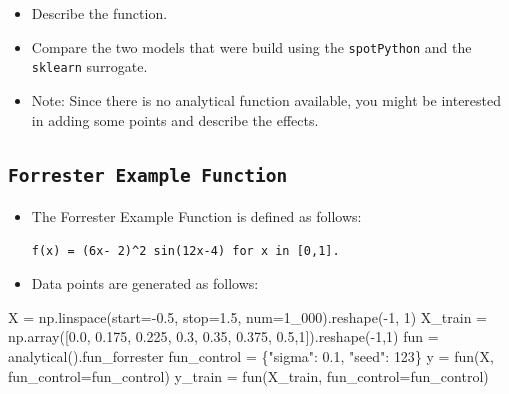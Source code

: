 \documentclass[
  letterpaper,
  DIV=11,
  numbers=noendperiod]{scrreprt}
\newenvironment{Shaded}{\begin{snugshade}}{\end{snugshade}}
\newcommand{\DecValTok}[1]{\textcolor[rgb]{0.68,0.00,0.00}{#1}}
\newcommand{\FloatTok}[1]{\textcolor[rgb]{0.68,0.00,0.00}{#1}}
\newcommand{\NormalTok}[1]{\textcolor[rgb]{0.00,0.23,0.31}{#1}}
\newcommand{\OperatorTok}[1]{\textcolor[rgb]{0.37,0.37,0.37}{#1}}
\newcommand{\StringTok}[1]{\textcolor[rgb]{0.13,0.47,0.30}{#1}}
\providecommand{\tightlist}{%
  \setlength{\itemsep}{0pt}\setlength{\parskip}{0pt}}\usepackage{longtable,booktabs,array}
\begin{document}
\begin{itemize}
\tightlist
\item
  Describe the function.
\item
  Compare the two models that were build using the \texttt{spotPython}
  and the \texttt{sklearn} surrogate.
\item
  Note: Since there is no analytical function available, you might be
  interested in adding some points and describe the effects.
\end{itemize}

\hypertarget{forrester-example-function}{%
\subsection{\texorpdfstring{\texttt{Forrester\ Example\ Function}}{Forrester Example Function}}\label{forrester-example-function}}

\begin{itemize}
\item
  The Forrester Example Function is defined as follows:

  \texttt{f(x)\ =\ (6x-\ 2)\^{}2\ sin(12x-4)\ for\ x\ in\ {[}0,1{]}.}
\item
  Data points are generated as follows:
\end{itemize}

\begin{Shaded}
\begin{Highlighting}[]
\NormalTok{X }\OperatorTok{=}\NormalTok{ np.linspace(start}\OperatorTok{={-}}\FloatTok{0.5}\NormalTok{, stop}\OperatorTok{=}\FloatTok{1.5}\NormalTok{, num}\OperatorTok{=}\DecValTok{1\_000}\NormalTok{).reshape(}\OperatorTok{{-}}\DecValTok{1}\NormalTok{, }\DecValTok{1}\NormalTok{)}
\NormalTok{X\_train }\OperatorTok{=}\NormalTok{ np.array([}\FloatTok{0.0}\NormalTok{, }\FloatTok{0.175}\NormalTok{, }\FloatTok{0.225}\NormalTok{, }\FloatTok{0.3}\NormalTok{, }\FloatTok{0.35}\NormalTok{, }\FloatTok{0.375}\NormalTok{, }\FloatTok{0.5}\NormalTok{,}\DecValTok{1}\NormalTok{]).reshape(}\OperatorTok{{-}}\DecValTok{1}\NormalTok{,}\DecValTok{1}\NormalTok{)}
\NormalTok{fun }\OperatorTok{=}\NormalTok{ analytical().fun\_forrester}
\NormalTok{fun\_control }\OperatorTok{=}\NormalTok{ \{}\StringTok{"sigma"}\NormalTok{: }\FloatTok{0.1}\NormalTok{,}
               \StringTok{"seed"}\NormalTok{: }\DecValTok{123}\NormalTok{\}}
\NormalTok{y }\OperatorTok{=}\NormalTok{ fun(X, fun\_control}\OperatorTok{=}\NormalTok{fun\_control)}
\NormalTok{y\_train }\OperatorTok{=}\NormalTok{ fun(X\_train, fun\_control}\OperatorTok{=}\NormalTok{fun\_control)}
\end{Highlighting}
\end{Shaded}
\end{document}
